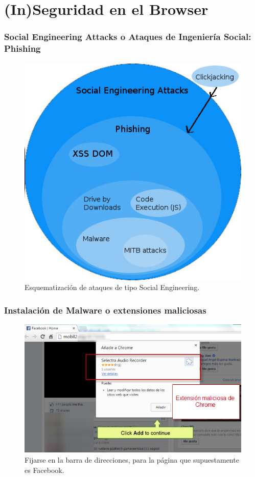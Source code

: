 \documentclass[serif,9pt]{beamer}
\begin{document}
\section{(In)Seguridad en el Browser}
\begin{frame}
	\frametitle{Social Engineering Attacks o Ataques de Ingenier\'ia Social: Phishing}
	\begin{figure}[h]
        \centering
        \includegraphics[scale=0.4]{figures/SEAttacks.jpg}
        \caption{Esquematizaci\'on de ataques de tipo Social Engineering.}
        \label{fig:SEattack}
    \end{figure}
\end{frame}

\begin{frame}
	\frametitle{Instalaci\'on de Malware o extensiones maliciosas}
	\begin{figure}[h]
        \centering
        \includegraphics[scale=0.4]{figures/fbporn3.png}
        \caption{Fijarse en la barra de direcciones, para la p\'agina que supuestamente es Facebook.}
        \label{fig:Malware}
    \end{figure}
\end{frame}
\end{document}
